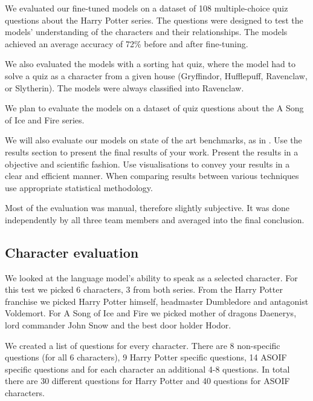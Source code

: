 \documentclass[fleqn,moreauthors,10pt]{ds_report}
\begin{document}

We evaluated our fine-tuned models on a dataset of 108 multiple-choice quiz questions about the Harry Potter series.
The questions were designed to test the models' understanding of the characters and their relationships.
The models achieved an average accuracy of 72\% before and after fine-tuning.

We also evaluated the models with a sorting hat quiz, where the model had to solve a quiz as a character from a given house (Gryffindor, Hufflepuff, Ravenclaw, or Slytherin).
The models were always classified into Ravenclaw.

We plan to evaluate the models on a dataset of quiz questions about the A Song of Ice and Fire series.

We will also evaluate our models on state of the art benchmarks, as in \cite{guo2023evaluating}.
Use the results section to present the final results of your work. Present the results in a objective and scientific fashion. Use visualisations to convey your results in a clear and efficient manner. When comparing results between various techniques use appropriate statistical methodology.

Most of the evaluation was manual, therefore slightly subjective.
It was done independently by all three team members and averaged into the final conclusion.

\subsection*{Character evaluation}
We looked at the language model's ability to speak as a selected character.
For this test we picked 6 characters, 3 from both series.
From the Harry Potter franchise we picked Harry Potter himself, headmaster Dumbledore and antagonist Voldemort.
For A Song of Ice and Fire we picked mother of dragons Daenerys, lord commander John Snow and the best door holder Hodor.

We created a list of questions for every character.
There are 8 non-specific questions (for all 6 characters), 9 Harry Potter specific questions, 14 ASOIF specific questions
and for each character an additional 4-8 questions.
In total there are 30 different questions for Harry Potter and 40 questions for ASOIF characters.
\end{document}
